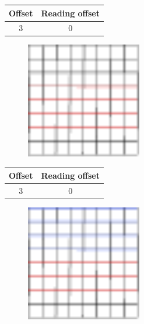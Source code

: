\documentclass{beamer}
\begin{document}
\begin{frame}{}
    \begin{table}
        \centering
        \begin{tabular}{|c|c|}
            \hline
            Offset & Reading offset \\
            \hline
            3 & 0 \\
            \hline
        \end{tabular}
    \end{table}
    \begin{figure}
        \centering
        \includegraphics[width=0.45\textwidth]{grid_3r_2.pdf}
        \label{fig:grid_3r_2}
    \end{figure}
\end{frame}

\begin{frame}{}
    \begin{table}
        \centering
        \begin{tabular}{|c|c|}
            \hline
            Offset & Reading offset \\
            \hline
            3 & 0 \\
            \hline
        \end{tabular}
    \end{table}
    \begin{figure}
        \centering
        \includegraphics[width=0.45\textwidth]{grid_3r_2_ro_1.pdf}
        \label{fig:grid_3r_2_ro_1}
    \end{figure}
\end{frame}
\end{document}

